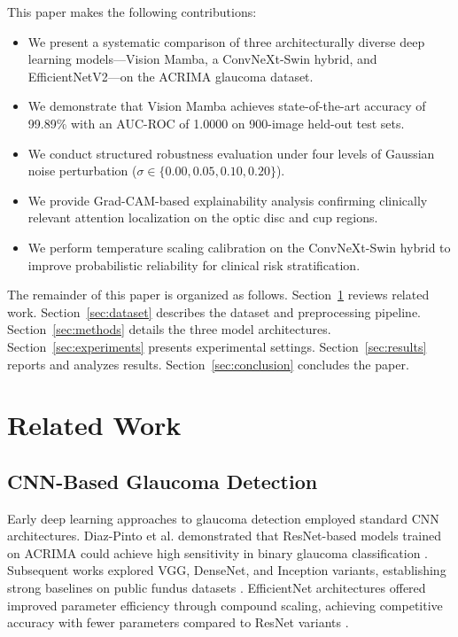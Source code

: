 \documentclass[conference]{IEEEtran}
\begin{document}
This paper makes the following contributions:
\begin{itemize}
    \item We present a systematic comparison of three 
    architecturally diverse deep learning models---Vision 
    Mamba, a ConvNeXt-Swin hybrid, and EfficientNetV2---on 
    the ACRIMA glaucoma dataset.
    \item We demonstrate that Vision Mamba achieves 
    state-of-the-art accuracy of 99.89\% with an AUC-ROC 
    of 1.0000 on 900-image held-out test sets.
    \item We conduct structured robustness evaluation under 
    four levels of Gaussian noise perturbation 
    ($\sigma \in \{0.00, 0.05, 0.10, 0.20\}$).
    \item We provide Grad-CAM-based explainability analysis 
    confirming clinically relevant attention localization on 
    the optic disc and cup regions.
    \item We perform temperature scaling calibration on 
    the ConvNeXt-Swin hybrid to improve probabilistic 
    reliability for clinical risk stratification.
\end{itemize}

The remainder of this paper is organized as follows. 
Section~\ref{sec:related} reviews related work. 
Section~\ref{sec:dataset} describes the dataset and 
preprocessing pipeline. Section~\ref{sec:methods} 
details the three model architectures. 
Section~\ref{sec:experiments} presents experimental 
settings. Section~\ref{sec:results} reports and 
analyzes results. Section~\ref{sec:conclusion} 
concludes the paper.


\section{Related Work}
\label{sec:related}

\subsection{CNN-Based Glaucoma Detection}

Early deep learning approaches to glaucoma detection 
employed standard CNN architectures. Diaz-Pinto et al. 
demonstrated that ResNet-based models trained on ACRIMA 
could achieve high sensitivity in binary glaucoma 
classification \cite{b8}. Subsequent works explored 
VGG, DenseNet, and Inception variants, establishing 
strong baselines on public fundus datasets \cite{b9}. 
EfficientNet architectures offered improved 
parameter efficiency through compound scaling, 
achieving competitive accuracy with fewer parameters 
compared to ResNet variants \cite{b10}.
\end{document}
